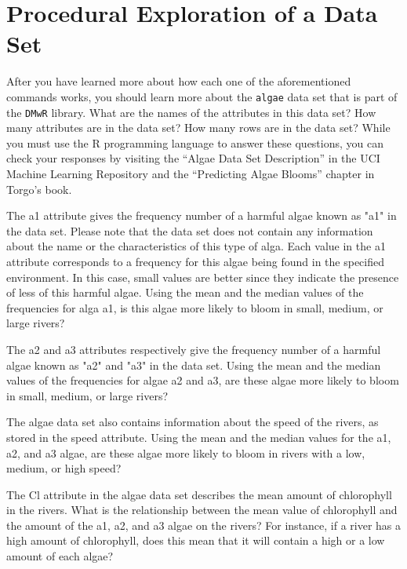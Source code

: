 
\section*{Procedural Exploration of a Data Set}

After you have learned more about how each one of the aforementioned commands works, you should learn more about the
{\tt algae} data set that is part of the {\tt DMwR} library. What are the names of the attributes in this data set? How
many attributes are in the data set? How many rows are in the data set? While you must use the R programming language to
answer these questions, you can check your responses by visiting the ``Algae Data Set Description'' in the UCI Machine
Learning Repository and the ``Predicting Algae Blooms'' chapter in Torgo's book. 

The a1 attribute gives the frequency number of a harmful algae known as "a1" in the data set. Please note that the data
set does not contain any information about the name or the characteristics of this type of alga. Each value in the a1
attribute corresponds to a frequency for this algae being found in the specified environment. In this case, small values
are better since they indicate the presence of less of this harmful algae. Using the mean and the median values of the
frequencies for alga a1, is this algae more likely to bloom in small, medium, or large rivers?

The a2 and a3 attributes respectively give the frequency number of a harmful algae known as "a2" and "a3" in the data
set. Using the mean and the median values of the frequencies for algae a2 and a3, are these algae more likely to bloom
in small, medium, or large rivers?

The algae data set also contains information about the speed of the rivers, as stored in the speed attribute. Using the
mean and the median values for the a1, a2, and a3 algae, are these algae more likely to bloom in rivers with a low,
medium, or high speed?

The Cl attribute in the algae data set describes the mean amount of chlorophyll in the rivers. What is the relationship
between the mean value of chlorophyll and the amount of the a1, a2, and a3 algae on the rivers? For instance, if a river
has a high amount of chlorophyll, does this mean that it will contain a high or a low amount of each algae?

